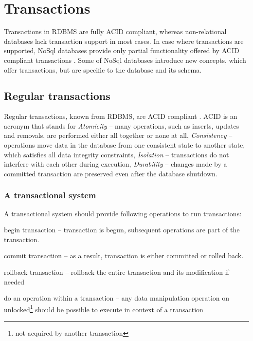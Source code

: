 \section{Transactions}\label{sec:theory:transactions}
Transactions in RDBMS are fully ACID compliant, whereas non-relational databases lack transaction support in most cases. 
In case where transactions are supported, NoSql databases provide only partial functionality offered by ACID compliant transactions \cite{StonebrakerSqlVsNosql}. 
Some of NoSql databases introduce new concepts, which offer transactions, but are specific to the database and its schema.


\subsection{Regular transactions}
Regular transactions, known from RDBMS, are ACID compliant \cite{ACID}. ACID is an acronym that stands for \emph{Atomicity} -- many operations, such as inserts, updates and removals, are performed either all together or none at all, \emph{Consistency} -- operations move data in the database from one consistent state to another state, which satisfies all data integrity constraints, \emph{Isolation} -- transactions do not interfere with each other during execution, \emph{Durability} -- changes made by a committed transaction are preserved even after the database shutdown.

\subsubsection{A transactional system}
A transactional system should provide following operations to run transactions:
\begin{enumerate*}
\item begin transaction -- transaction is begun, subsequent operations are part of the transaction. 
\item commit transaction -- as a result, transaction is either committed or rolled back.
\item rollback transaction -- rollback the entire transaction and its modification if needed
\item do an operation within a transaction -- any data manipulation operation on unlocked\footnote{not acquired by another transaction} should be possible to execute in context of a transaction
\end{enumerate*}


